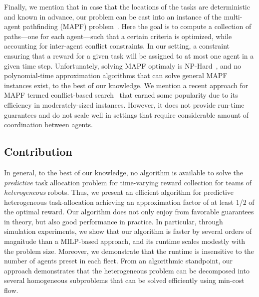 \documentclass[conference]{IEEEtran}
\newcommand{\frline}[2]{{\color{blue}#1}{\em \color{blue}[FR]: #2}}
\newcommand{\frline}[2]{#1}
\begin{document}
Finally, we mention that in case that the locations of the tasks are deterministic and known in advance, our problem can be cast into an instance of the multi-agent pathfinding (MAPF) problem~\cite{YuLaValle16}. Here the goal is to compute a collection of paths---one for each agent---such that a certain criteria is optimized, while accounting for inter-agent conflict constraints. In our setting, a constraint ensuring that a reward for a given task will be assigned to at most one agent in a given time step. Unfortunately, solving MAPF optimaly is NP-Hard~\cite{yu2013structure}, and no polynomial-time approximation algorithms that can solve general MAPF instances exist, to the best of our knowledge. We mention a recent approach for MAPF termed conflict-based search~\cite{felner2017search,ma2017lifelong,honig2018conflict,liu2019task} that earned some popularity due to its efficiency in moderately-sized instances. However, it does not provide run-time guarantees and do not scale well in settings that require considerable amount of coordination between agents. 

\subsection{Contribution}
In general, to the best of our knowledge, no algorithm is available to solve the \emph{predictive} task allocation problem for time-varying reward collection for teams of \emph{heterogeneous} robots.%
Thus, we present an efficient algorithm for predictive heterogeneous task-allocation achieving an approximation factor of at least 1/2 of the optimal reward. Our algorithm does not only enjoy from favorable guarantees in theory, but also good performance in practice. In particular, through simulation experiments, we show that our algorithm is faster by several orders of magnitude than a MILP-based approach, and its runtime scales modestly with the problem size. Moreover, we demonstrate that the runtime is insensitive to the number of agents preset in each fleet. From an algorithmic standpoint, our approach demonstrates that the heterogeneous problem can be decomposed into several homogeneous subproblems that can be solved efficiently using min-cost flow. 

\end{document}
